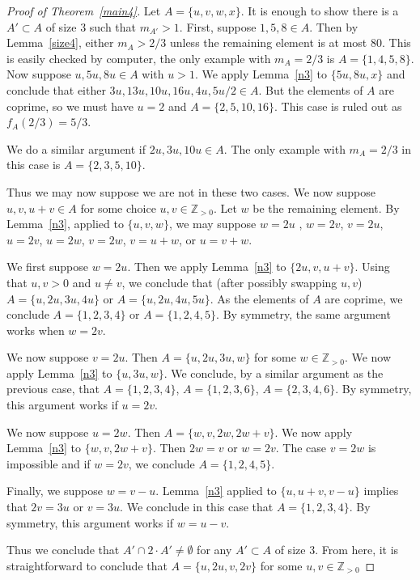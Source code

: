 \documentclass[12pt,reqno]{amsart}
\theoremstyle{dotless}
\begin{document}
 \begin{proof}[Proof of Theorem~\ref{main4}]
 Let $A = \{u,v,w,x\}$. It is enough to show there is a $A' \subset A$ of size 3 such that $m_{A'} > 1$. First, suppose $1,5,8 \in A$. Then by Lemma~\ref{size4}, either $m_A > 2/3$ unless the remaining element is at most 80. This is easily checked by computer, the only example with $m_A = 2/3$ is $A= \{1,4,5,8\}$. Now suppose $u , 5u , 8u  \in A$ with $u > 1$. We apply Lemma~\ref{n3} to $\{5u , 8u,x\}$ and conclude that either $3u ,13u , 10u,16u,4u,5u/2 \in A$. But the elements of $A$ are coprime, so we must have $u = 2$ and $A = \{2,5,10,16\}$. This case is ruled out as $f_A(2/3) = 5/3$. 
 
 We do a similar argument if $2u,3u,10u \in A$. The only example with $m_A =2/3$ in this case is $A = \{2,3,5,10\}$.
 
  Thus we may now suppose we are not in these two cases. We now suppose $u,v,u+v \in A$ for some choice $u,v\in\mathbb{Z}_{>0}$. Let $w$ be the remaining element. By Lemma~\ref{n3}, applied to $\{u,v,w\}$, we may suppose $w = 2u $ , $w = 2v$, $v = 2u$, $u = 2v$, $u= 2w$, $v = 2w$, $v = u+w$, or $u=v+w$. 
  
  
We first suppose $w = 2u$. Then we apply Lemma~\ref{n3} to $\{2u , v, u+v\}$. Using that $u , v > 0$ and $u \neq v$, we conclude that (after possibly swapping $u,v$) $A= \{u , 2u, 3u , 4u\}$ or $A = \{u , 2u , 4u , 5u\}$. As the elements of $A$ are coprime, we conclude $A = \{1,2,3,4\}$ or $A = \{1 ,2,4,5\}$. By symmetry, the same argument works when $w = 2v$. 

We now suppose $v = 2u$. Then $A= \{u , 2u , 3u , w\}$ for some $w \in \mathbb{Z}_{> 0}$. We now apply Lemma~\ref{n3} to $\{u , 3u , w\}$. We conclude, by a similar argument as the previous case, that 
$A = \{1,2,3,4\}$, $A = \{1,2,3,6\}$, $A = \{2,3,4,6\}$.  By symmetry, this argument works if $u = 2v$. 

We now suppose $u = 2w$. Then $A =\{w,v,2w , 2w + v\}$. We now apply Lemma~\ref{n3} to $\{w , v , 2w + v\}$. Then $2w = v$ or $w = 2v$. The case $v=2w$ is impossible and if $w= 2v$, we conclude $A =\{1,2,4,5\}$. 

Finally, we suppose $w= v-u$. Lemma~\ref{n3} applied to $\{u,u+v , v-u\}$ implies that $2v = 3u$ or $v = 3u$. We conclude in this case that $A = \{1,2,3,4\}$. By symmetry, this argument works if $w = u-v$. 


Thus we conclude that $A' \cap 2 \cdot A' \neq \emptyset$ for any $A' \subset A$ of size 3. From here, it is straightforward to conclude that $A= \{u,2u , v ,2v\}$ for some $u,v \in \mathbb{Z}_{>0}$
 \end{proof}
\end{document}
